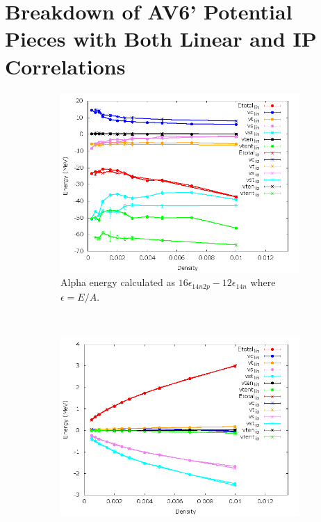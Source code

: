 \documentclass[12pt]{article}
\begin{document}
\section{Breakdown of AV6' Potential Pieces with Both Linear and IP Correlations}
\begin{figure}[h!]
   \centering
   \begin{subfigure}{0.49\textwidth}
      \includegraphics[width=\textwidth]{../av6_alpha_linVSip.png}
      \caption{Alpha energy calculated as $16\epsilon_{14n2p}-12\epsilon_{14n}$ where $\epsilon=E/A$.}
   \end{subfigure}
   ~
   \begin{subfigure}{0.49\textwidth}
      \includegraphics[width=\textwidth]{../av6_14n_linVSip.png}

\end{subfigure}
\end{figure}
\end{document}
